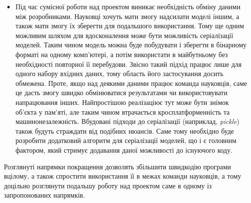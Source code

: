 \begin{itemize}
	\item Під час сумісної роботи над проектом виникає необхідність обміну даними між розробниками. Науковці хочуть мати змогу надсилати моделі іншим, а також мати змогу їх зберегти для подальшого використання. Тому ще одним можливим шляхом для вдосконалення може бути можливість серіалізації моделей. Таким чином модель можна буде побудувати і зберегти в бінарному форматі на одному комп'ютері, а потім використати в майбутньому без необхідності повторної її перебудови. Звісно такий підхід працює лише для одного набору вхідних даних, тому область його застосування досить обмежена. Проте, якщо над деякими даними працює команда науковців, саме це дасть змогу швидко обмінюватися результатами чи використовувати напрацювання інших. Найпростішою реалізаціює тут може бути знімок об'єкта у пам'яті, але таким чином втрачається кросплатформенність та машинонезалежність. Вбудовані підходи до серіалізації (наприклад, \textit{pickle}) також будуть страждати від подібних нюансів. Саме тому необхідно буде розробити додатковий алгоритм для серіалізації моделей, що і є головним фактором, який стримує додавання даної можливості до існуючого коду.
\end{itemize}

Розглянуті напрямки покращення дозволять збільшити швидкодію програми вцілому, а також спростити використання її в межах команди науковців, а тому доцільно розглянути подальшу роботу над проектом саме в одному із запропонованих напрямків.